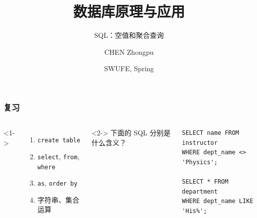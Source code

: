 \documentclass[aspectratio=169, 14pt]{beamer}
\title[Database Principles and Applications] %
{数据库原理与应用}
\subtitle{SQL：空值和聚合查询}
\author[CHEN Zhongpu] %
{CHEN Zhongpu}
\institute[] %
{
  School of Computing and Artificial Intelligence \\
  \href{mailto:zpchen@swufe.edu.cn}{zpchen@swufe.edu.cn}
}
\date[] %
{SWUFE, Spring \the\year{}}
\begin{document}
\frame{\titlepage}

\begin{frame}[fragile]
	\frametitle{复习}
	\begin{columns}
		<1->
		\begin{enumerate}
			\item \texttt{create table}
			\item \texttt{select}, \texttt{from}, \texttt{where}
			\item \texttt{as}, \texttt{order by}
			\item 字符串、集合运算
		\end{enumerate}
		<2->
		下面的 SQL 分别是什么含义？
		\begin{verbatim}
SELECT name FROM instructor 
WHERE dept_name <> 'Physics';

SELECT * FROM department
WHERE dept_name LIKE 'His%';
        \end{verbatim}
	\end{columns}

\end{frame}
\end{document}
